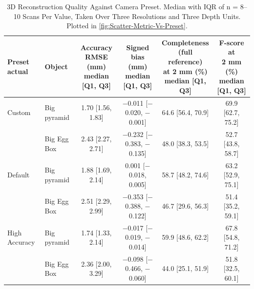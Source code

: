 \begin{table}[H]
	\centering
	\footnotesize
	\setlength{\tabcolsep}{4pt}
	\caption{3D Reconstruction Quality Against Camera Preset. Median with IQR of n = 8--10 Scans Per Value, Taken Over Three Resolutions and Three Depth Units. Plotted in \autoref{fig:Scatter-Metric-Vs-Preset}.}
	\label{tab:Scatter_Metric_Vs_Preset}
	\begin{tabular}{l l *{4}{c}}
		\toprule
		Preset actual & Object & \makecell{Accuracy\\RMSE (mm)\\{\scriptsize median [Q1, Q3]}} & \makecell{Signed\\bias (mm)\\{\scriptsize median [Q1, Q3]}} & \makecell{Completeness\\(full reference)\\at 2 mm (\%)\\{\scriptsize median [Q1, Q3]}} & \makecell{F-score at\\2 mm (\%)\\{\scriptsize median [Q1, Q3]}} \\
		\midrule
		Custom & Big pyramid & 1.70 [1.56, 1.83] & $-$0.011 [$-$0.020, $-$0.001] & 64.6 [56.4, 70.9] & 69.9 [62.7, 75.2] \\
		 & Big Egg Box & 2.43 [2.27, 2.71] & $-$0.232 [$-$0.383, $-$0.135] & 48.0 [38.3, 53.5] & 52.7 [43.8, 58.7] \\
		\addlinespace
		Default & Big pyramid & 1.88 [1.69, 2.14] & 0.001 [$-$0.018, 0.005] & 58.7 [48.2, 74.6] & 63.2 [52.9, 75.1] \\
		 & Big Egg Box & 2.51 [2.29, 2.99] & $-$0.353 [$-$0.388, $-$0.122] & 46.7 [29.6, 56.3] & 51.4 [35.2, 59.1] \\
		\addlinespace
		High Accuracy & Big pyramid & 1.74 [1.33, 2.14] & $-$0.017 [$-$0.019, $-$0.014] & 59.9 [48.6, 62.2] & 67.8 [54.8, 71.2] \\
		 & Big Egg Box & 2.36 [2.00, 3.29] & $-$0.098 [$-$0.466, $-$0.060] & 44.0 [25.1, 51.9] & 51.8 [32.5, 60.1] \\

\end{tabular}
\end{table}
